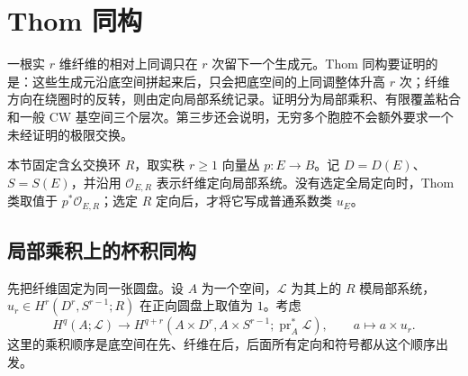 
% 
% 

\section{Thom 同构}
\label{g2:sec:2002}

一根实 \(r\) 维纤维的相对上同调只在 \(r\) 次留下一个生成元。Thom 同构要证明的是：这些生成元沿底空间拼起来后，只会把底空间的上同调整体升高 \(r\) 次；纤维方向在绕圈时的反转，则由定向局部系统记录。证明分为局部乘积、有限覆盖粘合和一般 CW 基空间三个层次。第三步还会说明，无穷多个胞腔不会额外要求一个未经证明的极限交换。

本节固定含幺交换环 \(R\)，取实秩 \(r\ge1\) 向量丛 \(p:E\to B\)。记 \(D=D(E)\)、\(S=S(E)\)，并沿用 \(\mathcal O_{E,R}\) 表示纤维定向局部系统。没有选定全局定向时，Thom 类取值于 \(p^*\mathcal O_{E,R}\)；选定 \(R\) 定向后，才将它写成普通系数类 \(u_E\)。

\subsection{局部乘积上的杯积同构}
\label{g2:subsec:2002:01}
先把纤维固定为同一张圆盘。设 \(A\) 为一个空间，\(\mathcal L\) 为其上的 \(R\) 模局部系统，\(u_r\in H^r(D^r,S^{r-1};R)\) 在正向圆盘上取值为 \(1\)。考虑
\begin{equation}\label{g2:eq:local-thom-map}
	H^q(A;\mathcal L)\longrightarrow H^{q+r}(A\times D^r,A\times S^{r-1};\operatorname{pr}_A^*\mathcal L),
	\qquad a\longmapsto a\times u_r.
\end{equation}
这里的乘积顺序是底空间在先、纤维在后，后面所有定向和符号都从这个顺序出发。

